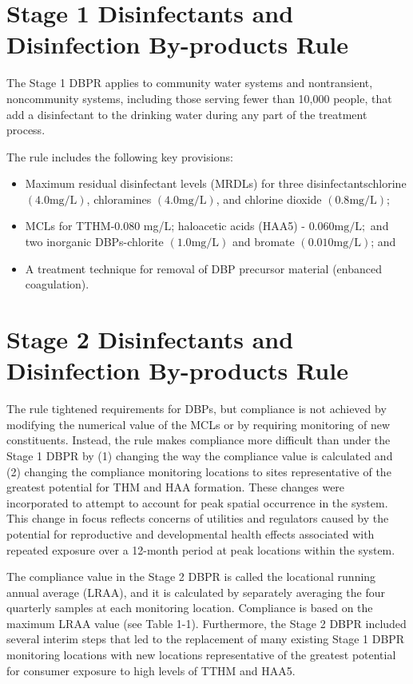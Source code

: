 \documentclass[10pt]{article}
\begin{document}
\section{Stage 1 Disinfectants and Disinfection By-products Rule}
The Stage 1 DBPR applies to community water systems and nontransient, noncommunity systems, including those serving fewer than 10,000 people, that add a disinfectant to the drinking water during any part of the treatment process.

The rule includes the following key provisions:

\begin{itemize}
  \item Maximum residual disinfectant levels (MRDLs) for three disinfectantschlorine $(4.0 \mathrm{mg} / \mathrm{L})$, chloramines $(4.0 \mathrm{mg} / \mathrm{L})$, and chlorine dioxide $(0.8 \mathrm{mg} / \mathrm{L})$;

  \item MCLs for TTHM-0.080 mg/L; haloacetic acids (HAA5) - $0.060 \mathrm{mg} / \mathrm{L} ;$ and two inorganic DBPs-chlorite $(1.0 \mathrm{mg} / \mathrm{L})$ and bromate $(0.010 \mathrm{mg} / \mathrm{L})$; and

  \item A treatment technique for removal of DBP precursor material (enbanced coagulation).

\end{itemize}
\section{Stage 2 Disinfectants and Disinfection By-products Rule}
The rule tightened requirements for DBPs, but compliance is not achieved by modifying the numerical value of the MCLs or by requiring monitoring of new constituents. Instead, the rule makes compliance more difficult than under the Stage 1 DBPR by (1) changing the way the compliance value is calculated and (2) changing the compliance monitoring locations to sites representative of the greatest potential for THM and HAA formation. These changes were incorporated to attempt to account for peak spatial occurrence in the system. This change in focus reflects concerns of utilities and regulators caused by the potential for reproductive and developmental health effects associated with repeated exposure over a 12-month period at peak locations within the system.

The compliance value in the Stage 2 DBPR is called the locational running annual average (LRAA), and it is calculated by separately averaging the four quarterly samples at each monitoring location. Compliance is based on the maximum LRAA value (see Table 1-1). Furthermore, the Stage 2 DBPR included several interim steps that led to the replacement of many existing Stage 1 DBPR monitoring locations with new locations representative of the greatest potential for consumer exposure to high levels of TTHM and HAA5.
\end{document}
